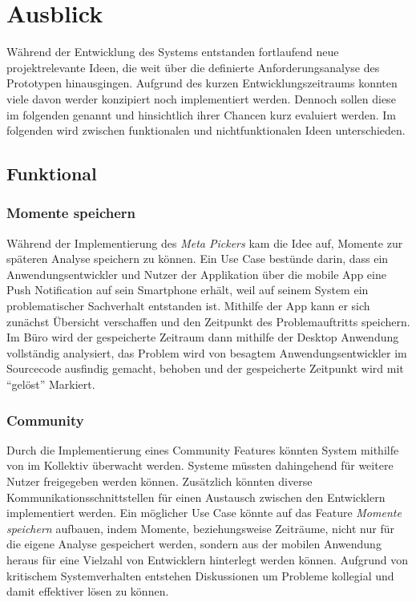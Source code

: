 \section{Ausblick}

Während der Entwicklung des Systems entstanden fortlaufend neue projektrelevante Ideen,
die weit über die definierte Anforderungsanalyse des Prototypen hinausgingen.
Aufgrund des kurzen Entwicklungszeitraums konnten viele davon werder konzipiert noch implementiert werden.
Dennoch sollen diese im folgenden genannt und hinsichtlich ihrer Chancen kurz evaluiert werden.
Im folgenden wird zwischen funktionalen und nichtfunktionalen Ideen unterschieden.

\subsection{Funktional}

\subsubsection{Momente speichern}

Während der Implementierung des \emph{Meta Pickers} kam die Idee auf, Momente zur späteren Analyse speichern zu können.
Ein Use Case bestünde darin, dass ein Anwendungsentwickler und Nutzer der Applikation \projectname{}
über die mobile App eine Push Notification auf sein Smartphone erhält, weil auf seinem System ein problematischer Sachverhalt
entstanden ist. Mithilfe der App kann er sich zunächst Übersicht verschaffen und den Zeitpunkt des Problemauftritts speichern.
Im Büro wird der gespeicherte Zeitraum dann mithilfe der Desktop Anwendung vollständig analysiert,
das Problem wird von besagtem Anwendungsentwickler im Sourcecode ausfindig gemacht, behoben und der gespeicherte Zeitpunkt wird mit ``gelöst'' Markiert.

\subsubsection{Community}

Durch die Implementierung eines Community Features könnten System mithilfe von \projectname{} im Kollektiv überwacht werden.
Systeme müssten dahingehend für weitere Nutzer freigegeben werden können.
Zusätzlich könnten diverse Kommunikationsschnittstellen für einen
Austausch zwischen den Entwicklern implementiert werden. Ein möglicher Use Case könnte auf das Feature
\emph{Momente speichern} aufbauen,
indem Momente, beziehungsweise Zeiträume, nicht nur für die eigene Analyse gespeichert werden, sondern aus der mobilen Anwendung heraus
für eine Vielzahl von Entwicklern hinterlegt werden können.
Aufgrund von kritischem Systemverhalten entstehen Diskussionen um Probleme kollegial und damit effektiver lösen zu können.

